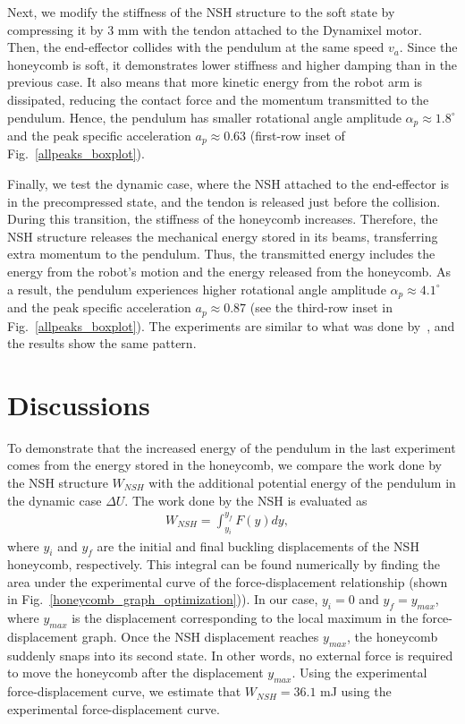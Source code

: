 \documentclass[lettersize,journal]{IEEEtran}
\begin{document}
Next, we modify the stiffness of the NSH structure to the soft state by compressing it by 3 mm with the tendon attached to the Dynamixel motor. Then, the end-effector collides with the pendulum at the same speed $v_a$. Since the honeycomb is soft, it demonstrates lower stiffness and higher damping than in the previous case. It also means that more kinetic energy from the robot arm is dissipated, reducing the contact force and the momentum transmitted to the pendulum. Hence, the pendulum has smaller rotational angle amplitude $\alpha_p\approx1.8^{\circ}$ and the peak specific acceleration $a_p\approx 0.63$ (first-row inset of Fig.~\ref{allpeaks_boxplot}).

Finally, we test the dynamic case, where the NSH attached to the end-effector is in the precompressed state, and the tendon is released just before the collision. During this transition, the stiffness of the honeycomb increases. Therefore, the NSH structure releases the mechanical energy stored in its beams, transferring extra momentum to the pendulum. Thus, the transmitted energy includes the energy from the robot's motion and the energy released from the honeycomb. As a result, the pendulum experiences higher rotational angle amplitude $\alpha_p\approx4.1^{\circ}$ and the peak specific acceleration $a_p\approx 0.87$ (see the third-row inset in Fig.~\ref{allpeaks_boxplot}). The experiments are similar to what was done by~\cite{jin2022design}, and the results show the same pattern.

\section{Discussions}
\label{sec:discuss}
To demonstrate that the increased energy of the pendulum in the last experiment comes from the energy stored in the honeycomb, we compare the work done by the NSH structure $W_{NSH}$ with the additional potential energy of the pendulum in the dynamic case $\Delta U$. 
The work done by the NSH is evaluated as
\begin{equation}\label{eq:eq3}
\begin{split}
W_{NSH} = \int_{y_i}^{y_f}F(y)dy, &
\end{split}
\end{equation}
where $y_{i}$ and $y_f$ are the initial and final buckling displacements of the NSH honeycomb, respectively. This integral can be found numerically by finding the area under the experimental curve of the force-displacement relationship (shown in Fig.~\ref{honeycomb_graph_optimization})). In our case, $y_i=0$ and $y_f=y_{max}$, where $y_{max}$ is the displacement corresponding to the local maximum in the force-displacement graph. Once the NSH displacement reaches $y_{max}$, the honeycomb suddenly snaps into its second state. In other words, no external force is required to move the honeycomb after the displacement $y_{max}$. Using the experimental force-displacement curve, we estimate that $W_{NSH} = 36.1$ mJ using the experimental force-displacement curve.
\end{document}

